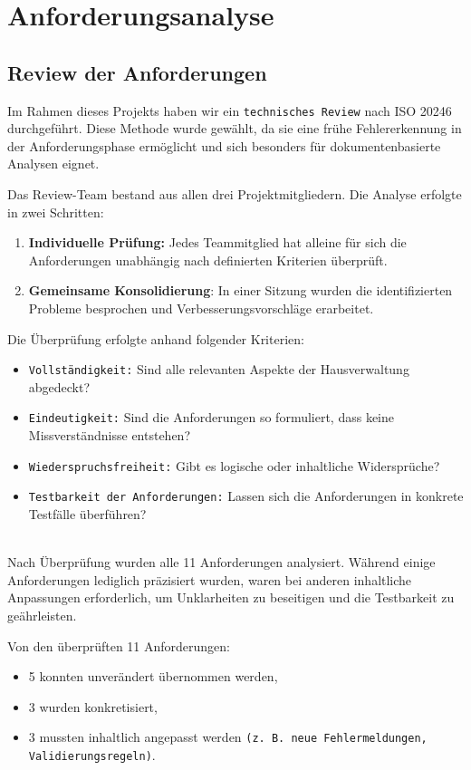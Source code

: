 \section{Anforderungsanalyse}\label{Anforderungsanalyse}

\subsection{Review der Anforderungen}


Im Rahmen dieses Projekts haben wir ein \texttt{technisches Review} nach ISO 20246 durchgeführt.  
Diese Methode wurde gewählt, da sie eine frühe Fehlererkennung in der Anforderungsphase ermöglicht und sich besonders für dokumentenbasierte Analysen eignet. \par

Das Review-Team bestand aus allen drei Projektmitgliedern. Die Analyse erfolgte in zwei Schritten:
\begin{enumerate}
	\item \textbf{Individuelle Prüfung:} Jedes Teammitglied hat alleine für sich die Anforderungen unabhängig nach definierten Kriterien überprüft.
	\item \textbf{Gemeinsame Konsolidierung}: In einer Sitzung wurden die identifizierten Probleme besprochen und Verbesserungsvorschläge erarbeitet.
\end{enumerate}

Die Überprüfung erfolgte anhand folgender Kriterien:
\begin{itemize}[noitemsep, topsep=0pt, parsep=0pt, partopsep=0pt]
	\item \texttt{Vollständigkeit:} Sind alle relevanten Aspekte der Hausverwaltung abgedeckt?
	\item \texttt{Eindeutigkeit:} Sind die Anforderungen so formuliert, dass keine Missverständnisse entstehen?
	\item \texttt{Wiederspruchsfreiheit:} Gibt es logische oder inhaltliche Widersprüche?
	\item \texttt{Testbarkeit der Anforderungen:} Lassen sich die Anforderungen in konkrete Testfälle überführen?
\end{itemize}
\\  
Nach Überprüfung wurden alle 11 Anforderungen analysiert. Während einige Anforderungen lediglich präzisiert wurden, waren bei anderen inhaltliche Anpassungen  erforderlich, um Unklarheiten zu beseitigen und die Testbarkeit zu geährleisten.\par
Von den überprüften 11 Anforderungen:
\begin{itemize}
	\item 5 konnten unverändert übernommen werden,
	\item 3 wurden konkretisiert,
	\item 3 mussten inhaltlich angepasst werden \texttt{(z. B. neue Fehlermeldungen, Validierungsregeln)}.
\end{itemize}

